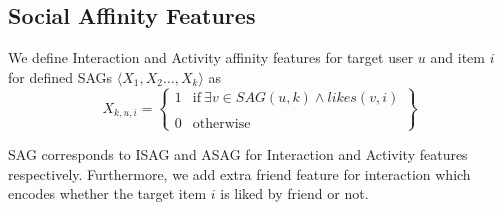 \subsection{Social Affinity Features}
\label{ssec:SAfeature}
We define Interaction and Activity affinity features for target user $u$ and item $i$ for defined SAGs $ \langle X_{1},X_{2}\ldots,X_{k}\rangle$ as
  \begin{equation*}
   X_{k,u,i} = \begin{Bmatrix}
   		\mathit{1} & \text{if}\ \exists v\in SAG(u,k) \wedge likes(v,i)\\ \\
   		\mathit{0} & \text{otherwise}
   \end{Bmatrix}
  \end{equation*}

SAG corresponds to ISAG and ASAG for Interaction and Activity features respectively. Furthermore, we add extra friend feature for interaction which encodes whether the target item $i$ is liked by friend or not.



